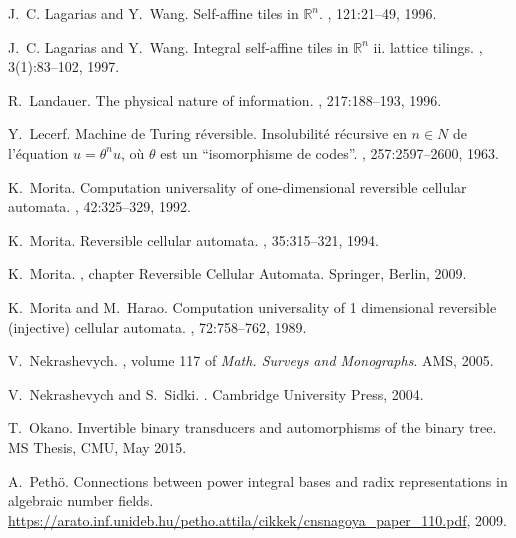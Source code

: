 \documentclass[12pt]{svmult}
\def\R{\mathbb{R}}
\begin{document}
\begin{thebibliography}{10}
J.~C. Lagarias and Y.~Wang.
\newblock Self-affine tiles in {$\R^n$}.
, 121:21--49, 1996.

J.~C. Lagarias and Y.~Wang.
\newblock Integral self-affine tiles in {$\R^n$} ii. lattice tilings.
, 3(1):83--102, 1997.

R.~Landauer.
\newblock The physical nature of information.
, 217:188--193, 1996.

Y.~Lecerf.
\newblock Machine de {T}uring r{\'e}versible. {I}nsolubilit{\'e} r{\'e}cursive
  en {$n \in N$} de l'{\'e}quation $u = \theta^nu$, o{\`u} $\theta$ est un
  ``isomorphisme de codes''.
, 257:2597--2600, 1963.

K.~Morita.
\newblock Computation universality of one-dimensional reversible cellular
  automata.
, 42:325--329, 1992.

K.~Morita.
\newblock Reversible cellular automata.
, 35:315--321, 1994.

K.~Morita.
, chapter
  Reversible Cellular Automata.
\newblock Springer, Berlin, 2009.

K.~Morita and M.~Harao.
\newblock Computation universality of 1 dimensional reversible (injective)
  cellular automata.
, 72:758--762, 1989.

V.~Nekrashevych.
, volume 117 of {\em Math. Surveys and
  Monographs}.
\newblock AMS, 2005.

V.~Nekrashevych and S.~Sidki.
.
\newblock Cambridge University Press, 2004.

T.~Okano.
\newblock Invertible binary transducers and automorphisms of the binary tree.
\newblock MS Thesis, CMU, May 2015.

A.~Peth{\"o}.
\newblock Connections between power integral bases and radix representations in
  algebraic number fields.
\newblock
  \url{https://arato.inf.unideb.hu/petho.attila/cikkek/cnsnagoya_paper_110.pdf},
  2009.


\end{thebibliography}
\end{document}
